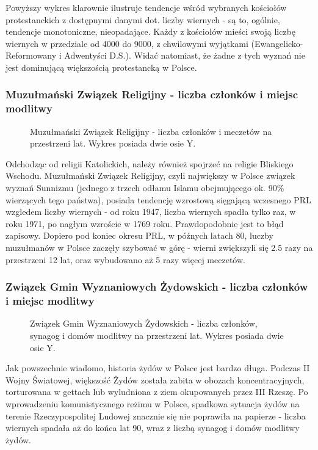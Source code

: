 \documentclass[12pt]{article}
\begin{document}
Powyższy wykres klarownie ilustruje tendencje wśród wybranych kościołów protestanckich z dostępnymi danymi dot. liczby wiernych - są to, ogólnie, tendencje monotoniczne, nieopadające. 
Każdy z kościołów mieści swoją liczbę wiernych w przedziale od 4000 do 9000, z chwilowymi wyjątkami (Ewangelicko-Reformowany i Adwentyści D.S.). Widać natomiast, że żadne z tych wyznań nie jest dominującą
większością protestancką w Polsce.


\subsubsection{Muzułmański Związek Religijny - liczba członków i miejsc modlitwy}
\begin{figure}[H]
    
    \caption{Muzułmański Związek Religijny - liczba członków i meczetów na przestrzeni lat. Wykres posiada dwie osie Y.}
\end{figure}
Odchodząc od religii Katolickich, należy również spojrzeć na religie Bliskiego Wschodu. Muzułmański Związek Religijny, czyli największy w Polsce związek wyznań Sunnizmu (jednego z trzech odłamu Islamu 
obejmującego ok. 90\% wierzących tego państwa), posiada tendencję wzrostową sięgającą wczesnego PRL wzgledem liczby wiernych - od roku 1947, liczba wiernych spadła tylko raz, w roku 1971, po nagłym wzroście w 1769 roku. 
Prawdopodobnie jest to błąd zapisowy.
Dopiero pod koniec okresu PRL, w późnych latach 80, luczby muzułmanów w Polsce zaczęły szybować w górę - wierni zwiększyli się 2.5 razy na przestrzeni 12 lat, oraz wybudowano aż 5 razy więcej meczetów.  

\subsubsection{Związek Gmin Wyznaniowych Żydowskich - liczba członków i miejsc modlitwy}
\begin{figure}[H]
    
    \caption{Związek Gmin Wyznaniowych Żydowskich - liczba członków, synagog i domów modlitwy na przestrzeni lat. Wykres posiada dwie osie Y.}
\end{figure}
Jak powszechnie wiadomo, historia żydów w Polsce jest bardzo długa. Podczas II Wojny Światowej, większość Żydów została zabita w obozach koncentracyjnych, torturowana w gettach lub wyludniona z ziem okupowanych
przez III Rzeszę. Po wprowadzeniu komunistycznego reżimu w Polsce, spadkowa sytuacja żydów na terenie Rzeczypospolitej Ludowej znacznie się nie poprawiła na papierze - liczba wiernych spadała aż do końca lat 90, 
wraz z liczbą synagog i domów modlitwy żydów.
\end{document}

